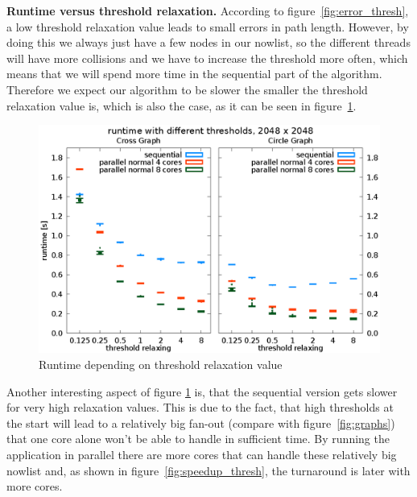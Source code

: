 \documentclass[letterpaper]{article}
\newcommand{\mypar}[1]{{\bf #1.}}
\begin{document}
\mypar{Runtime versus threshold relaxation}
According to figure~\ref{fig:error_thresh}, a low threshold relaxation value leads to small errors in path length. However, by doing this we always just have a few nodes in our nowlist, so the different threads will have more collisions and we have to increase the threshold more often, which means that we will spend more time in the sequential part of the algorithm. Therefore we expect our algorithm to be slower the smaller the threshold relaxation value is, which is also the case, as it can be seen in figure~\ref{fig:runtime_thresh}.\\
\begin{figure}[h]\centering
  \includegraphics[scale=0.558]{runtime_threshold.eps}
  \caption{Runtime depending on threshold relaxation value\label{fig:runtime_thresh}}
\end{figure}
Another interesting aspect of figure \ref{fig:runtime_thresh} is, that the sequential version gets slower for very high relaxation values. This is due to the fact, that high thresholds at the start will lead to a relatively big fan-out (compare with figure~\ref{fig:graphs}) that one core alone won't be able to handle in sufficient time. By running the application in parallel there are more cores that can handle these relatively big nowlist and, as shown in figure~\ref{fig:speedup_thresh}, the turnaround is later with more cores.
\end{document}
